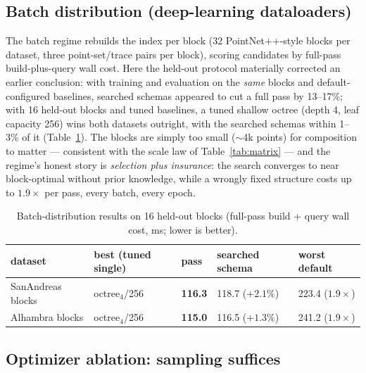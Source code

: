 \subsection{Batch distribution (deep-learning dataloaders)}
\label{sec:eval-batch}

The batch regime rebuilds the index per block (32 PointNet++-style blocks per dataset, three point-set/trace pairs per block), scoring candidates by full-pass build-plus-query wall cost. Here the held-out protocol materially corrected an earlier conclusion: with training and evaluation on the \emph{same} blocks and default-configured baselines, searched schemas appeared to cut a full pass by 13--17\%; with 16 held-out blocks and tuned baselines, a tuned shallow octree (depth 4, leaf capacity 256) wins both datasets outright, with the searched schemas within 1--3\% of it (Table~\ref{tab:batch}). The blocks are simply too small ($\sim$4k points) for composition to matter --- consistent with the scale law of Table~\ref{tab:matrix} --- and the regime's honest story is \emph{selection plus insurance}: the search converges to near block-optimal without prior knowledge, while a wrongly fixed structure costs up to $1.9\times$ per pass, every batch, every epoch.

\begin{table}[t]
  \centering
  \caption{Batch-distribution results on 16 held-out blocks (full-pass build + query wall cost, ms; lower is better).}
  \label{tab:batch}
  \small
  \begin{tabular}{lllll}
    \toprule
    dataset & best (tuned single) & pass & searched schema & worst default \\
    \midrule
    SanAndreas blocks & octree$_{4}$/256 & \textbf{116.3} & 118.7 ($+2.1\%$) & 223.4 ($1.9\times$) \\
    Alhambra blocks   & octree$_{4}$/256 & \textbf{115.0} & 116.5 ($+1.3\%$) & 241.2 ($1.9\times$) \\
    \bottomrule
  \end{tabular}
\end{table}

\subsection{Optimizer ablation: sampling suffices}
\label{sec:eval-ablation}

